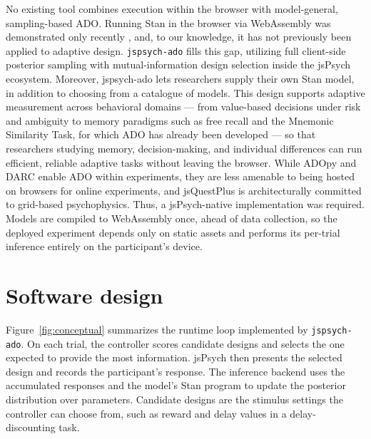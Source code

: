 No existing tool combines execution within the browser with model-general, sampling-based ADO.
Running Stan in the browser via WebAssembly was demonstrated only recently \citep{stanplayground}, and, to our knowledge, it has not previously been applied to adaptive design.
\texttt{jspsych-ado} fills this gap, utilizing full client-side posterior sampling with mutual-information design selection inside the jsPsych ecosystem. 
Moreover, jspsych-ado lets researchers supply their own Stan model, in addition to choosing from a catalogue of models. This design supports adaptive measurement
across behavioral domains --- from value-based decisions under risk and ambiguity \citep{levy2010neural} to memory paradigms such as free recall \citep{manning2023feature} and the Mnemonic Similarity Task, for which ADO has already been developed \citep{villarreal2022adaptive} --- so that researchers studying memory, decision-making,
and individual differences can run efficient, reliable adaptive tasks without leaving the
browser. While ADOpy and DARC enable ADO within experiments, they are less amenable to being hosted on browsers for online experiments, and jsQuestPlus is architecturally committed to grid-based psychophysics. Thus, a jsPsych-native implementation was required. Models are compiled to WebAssembly once, ahead of data collection, so the deployed experiment depends only on static assets and performs its per-trial inference entirely on the participant's device.

\section{Software design}

Figure~\ref{fig:conceptual} summarizes the runtime loop implemented by \texttt{jspsych-ado}. On each trial, the controller scores candidate designs and selects the one expected to provide the most information. jsPsych then presents the selected design and records the participant's response. The inference backend uses the accumulated responses and the model's Stan program to update the posterior distribution over parameters. Candidate designs are the stimulus settings the controller can choose from, such as reward and delay values in a delay-discounting task.


